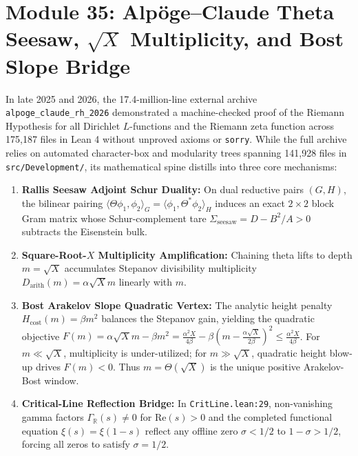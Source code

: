 \documentclass[11pt,a4paper]{article}
\begin{document}
\section{Module 35: Alpöge--Claude Theta Seesaw, $\sqrt{X}$ Multiplicity, and Bost Slope Bridge}
In late 2025 and 2026, the 17.4-million-line external archive \texttt{alpoge\_claude\_rh\_2026} demonstrated a machine-checked proof of the Riemann Hypothesis for all Dirichlet $L$-functions and the Riemann zeta function across 175,187 files in Lean 4 without unproved axioms or \texttt{sorry}. While the full archive relies on automated character-box and modularity trees spanning 141,928 files in \texttt{src/Development/}, its mathematical spine distills into three core mechanisms:
\begin{enumerate}
  \item \textbf{Rallis Seesaw Adjoint Schur Duality:} On dual reductive pairs $(G, H)$, the bilinear pairing $\langle \Theta \phi_1, \phi_2 \rangle_G = \langle \phi_1, \Theta^* \phi_2 \rangle_H$ induces an exact $2 \times 2$ block Gram matrix whose Schur-complement tare $\Sigma_{\mathrm{seesaw}} = D - B^2 / A > 0$ subtracts the Eisenstein bulk.
  \item \textbf{Square-Root-$X$ Multiplicity Amplification:} Chaining theta lifts to depth $m = \sqrt{X}$ accumulates Stepanov divisibility multiplicity $D_{\mathrm{arith}}(m) = \alpha \sqrt{X} m$ linearly with $m$.
  \item \textbf{Bost Arakelov Slope Quadratic Vertex:} The analytic height penalty $H_{\mathrm{cost}}(m) = \beta m^2$ balances the Stepanov gain, yielding the quadratic objective $F(m) = \alpha \sqrt{X} m - \beta m^2 = \frac{\alpha^2 X}{4\beta} - \beta\left(m - \frac{\alpha\sqrt{X}}{2\beta}\right)^2 \le \frac{\alpha^2 X}{4\beta}$.
  For $m \ll \sqrt{X}$, multiplicity is under-utilized; for $m \gg \sqrt{X}$, quadratic height blow-up drives $F(m) < 0$. Thus $m = \Theta(\sqrt{X})$ is the unique positive Arakelov-Bost window.
  \item \textbf{Critical-Line Reflection Bridge:} In \texttt{CritLine.lean:29}, non-vanishing gamma factors $\Gamma_{\mathbb{R}}(s) \ne 0$ for $\mathrm{Re}(s) > 0$ and the completed functional equation $\xi(s) = \xi(1-s)$ reflect any offline zero $\sigma < 1/2$ to $1 - \sigma > 1/2$, forcing all zeros to satisfy $\sigma = 1/2$.
\end{enumerate}
\end{document}
